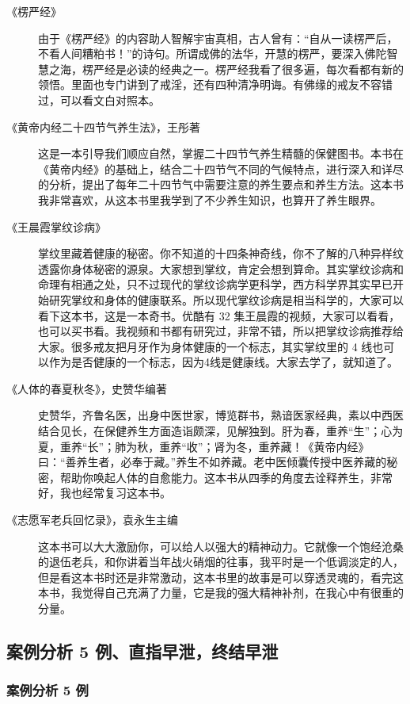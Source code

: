 \documentclass[fontset=founder]{ctexart}
\begin{document}
\begin{description}
    \item[《楞严经》] 由于《楞严经》的内容助人智解宇宙真相，古人曾有：“自从一读楞严后，不看人间糟粕书！”的诗句。所谓成佛的法华，开慧的楞严，要深入佛陀智慧之海，楞严经是必读的经典之一。楞严经我看了很多遍，每次看都有新的领悟。里面也专门讲到了戒淫，还有四种清净明诲。有佛缘的戒友不容错过，可以看文白对照本。
    \item[《黄帝内经二十四节气养生法》，王彤著] 这是一本引导我们顺应自然，掌握二十四节气养生精髓的保健图书。本书在《黄帝内经》的基础上，结合二十四节气不同的气候特点，进行深入和详尽的分析，提出了每年二十四节气中需要注意的养生要点和养生方法。这本书我非常喜欢，从这本书里我学到了不少养生知识，也算开了养生眼界。
    \item[《王晨霞掌纹诊病》] 掌纹里藏着健康的秘密。你不知道的十四条神奇线，你不了解的八种异样纹透露你身体秘密的源泉。大家想到掌纹，肯定会想到算命。其实掌纹诊病和命理有相通之处，只不过现代的掌纹诊病学更科学，西方科学界其实早已开始研究掌纹和身体的健康联系。所以现代掌纹诊病是相当科学的，大家可以看下这本书，这是一本奇书。优酷有 32 集王晨霞的视频，大家可以看看，也可以买书看。我视频和书都有研究过，非常不错，所以把掌纹诊病推荐给大家。很多戒友把月牙作为身体健康的一个标志，其实掌纹里的 4 线也可以作为是否健康的一个标志，因为4线是健康线。大家去学了，就知道了。
    \item[《人体的春夏秋冬》，史赞华编著] 史赞华，齐鲁名医，出身中医世家，博览群书，熟谙医家经典，素以中西医结合见长，在保健养生方面造诣颇深，见解独到。肝为春，重养“生”；心为夏，重养“长”；肺为秋，重养“收”；肾为冬，重养藏！《黄帝内经》曰：“善养生者，必奉于藏。”养生不如养藏。老中医倾囊传授中医养藏的秘密，帮助你唤起人体的自愈能力。这本书从四季的角度去诠释养生，非常好，我也经常复习这本书。
    \item[《志愿军老兵回忆录》，袁永生主编] 这本书可以大大激励你，可以给人以强大的精神动力。它就像一个饱经沧桑的退伍老兵，和你讲着当年战火硝烟的往事，我平时是一个低调淡定的人，但是看这本书时还是非常激动，这本书里的故事是可以穿透灵魂的，看完这本书，我觉得自己充满了力量，它是我的强大精神补剂，在我心中有很重的分量。
\end{description}

\subsection{案例分析 5 例、直指早泄，终结早泄}

\subsubsection{案例分析 5 例}
\end{document}
